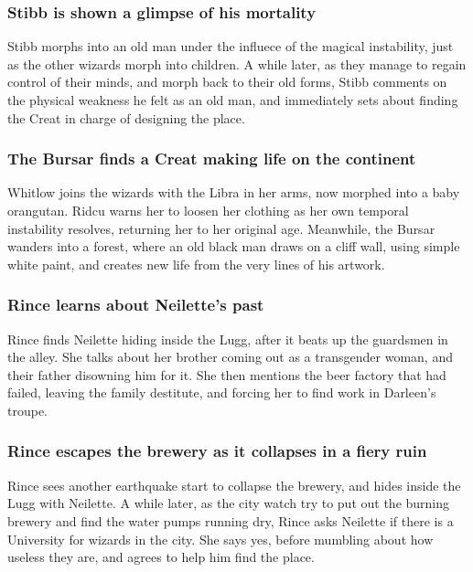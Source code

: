 \subsubsection{\Gls{Stibb} is shown a glimpse of his mortality}
\Gls{Stibb} morphs into an old man under the influece of the magical instability, just as the other
wizards morph into children. A while later, as they manage to regain control of their minds, and
morph back to their old forms, \Gls{Stibb} comments on the physical weakness he felt as an old man,
and immediately sets about finding the \Gls{Creat} in charge of designing the place.

\subsubsection{The \Gls{Bursar} finds a \Gls{Creat} making life on the continent}
\Gls{Whitlow} joins the wizards with the \Gls{Libra} in her arms, now morphed into a baby orangutan.
\Gls{Ridcu} warns her to loosen her clothing as her own temporal instability resolves, returning her
to her original age. Meanwhile, the \Gls{Bursar} wanders into a forest, where an old black man
draws on a cliff wall, using simple white paint, and creates new life from the very lines of his
artwork.

\subsubsection{\Gls{Rince} learns about \Gls{Neilette}'s past}
\Gls{Rince} finds \Gls{Neilette} hiding inside the \Gls{Lugg}, after it beats up the guardsmen in
the alley. She talks about her brother coming out as a transgender woman, and their father disowning
him for it. She then mentions the beer factory that had failed, leaving the family destitute, and
forcing her to find work in \Gls{Darleen}'s troupe.

\subsubsection{\Gls{Rince} escapes the brewery as it collapses in a fiery ruin}
\Gls{Rince} sees another earthquake start to collapse the brewery, and hides inside the \Gls{Lugg}
with \Gls{Neilette}. A while later, as the city watch try to put out the burning brewery and find
the water pumps running dry, \Gls{Rince} asks \Gls{Neilette} if there is a University for wizards in
the city. She says yes, before mumbling about how useless they are, and agrees to help him find
the place.


